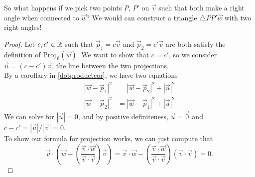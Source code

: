 So what happens if we pick two points $P$, $P'$ on $\vec{v}$ such that both make a right angle when connected to $\vec{w}$? We would can construct a triangle $\triangle PP'\vec{w}$ with two right angles!
\begin{proof}
	Let $c, c'\in\mathbb{R}$ such that $\vec{p}_1=c\vec{v}$ and $\vec{p}_2=c'\vec{v}$ are both satisfy the definition of $\textrm{Proj}_{\vec{v}}({\vec{w}})$. We want to show that $c=c'$, so we consider $\vec{u}=(c-c')\vec{v}$, the line between the two projections.\\
	By a corollary in \ref{dotproductcor}, we have two equations \begin{align*}
	|\vec{w}-\vec{p}_1|^2&=|\vec{w}-\vec{p}_2|^2+|\vec{u}|^2 \\	
	|\vec{w}-\vec{p}_2|^2&=|\vec{w}-\vec{p}_1|^2+|\vec{u}|^2 
	\end{align*}
	We can solve for $|\vec{u}|=0$, and by positive definiteness, $\vec{u}=\vec{0}$ and $c-c' = |\vec{u}|/|\vec{v}| =0$.\\
	To show our formula for projection works, we can just compute that \[
	\vec{v} \cdot \left(\vec{w}-\left(\frac{\vec{v}\cdot{\vec{w}}}{\vec{v}\cdot\vec{v}}\right)\vec{v}\right)=\vec{v}\cdot\vec{w} -\left(\frac{\vec{v}\cdot\vec{w}}{\vec{v}\cdot\vec{v}}\right)(\vec{v}\cdot\vec{v})=0.
	\]
\end{proof}
\exercises
